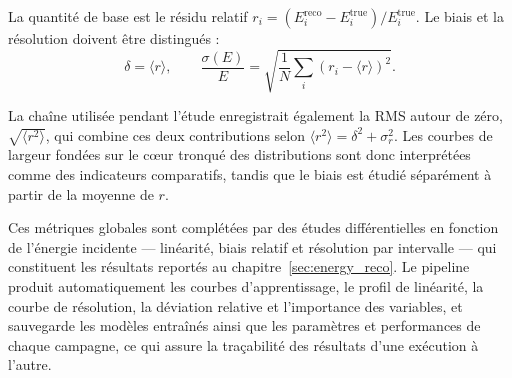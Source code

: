 La quantité de base est le résidu relatif \(r_i = (E_i^{\mathrm{reco}}-E_i^{\mathrm{true}})/E_i^{\mathrm{true}}\). Le biais et la résolution doivent être distingués :
\[
\delta=\langle r\rangle,
\qquad
\frac{\sigma(E)}{E}
=
\sqrt{
\frac{1}{N}\sum_i (r_i-\langle r\rangle)^2
}.
\]

La chaîne utilisée pendant l'étude enregistrait également la RMS autour de zéro, \(\sqrt{\langle r^2\rangle}\), qui combine ces deux contributions selon \(\langle r^2\rangle=\delta^2+\sigma_r^2\). Les courbes de largeur fondées sur le c\oe ur tronqué des distributions sont donc interprétées comme des indicateurs comparatifs, tandis que le biais est étudié séparément à partir de la moyenne de \(r\).

Ces métriques globales sont complétées par des études différentielles en fonction de l'énergie incidente — linéarité, biais relatif et résolution par intervalle — qui constituent les résultats reportés au chapitre~\ref{sec:energy_reco}. Le pipeline produit automatiquement les courbes d'apprentissage, le profil de linéarité, la courbe de résolution, la déviation relative et l'importance des variables, et sauvegarde les modèles entraînés ainsi que les paramètres et performances de chaque campagne, ce qui assure la traçabilité des résultats d'une exécution à l'autre.
